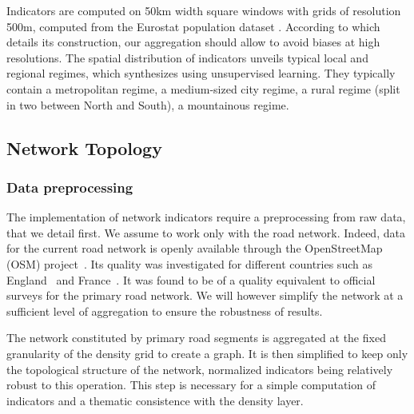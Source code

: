 Indicators are computed on 50km width square windows with grids of resolution 500m, computed from the Eurostat population dataset \citep{eurostat}. According to \cite{batista2013high} which details its construction, our aggregation should allow  to avoid biases at high resolutions. The spatial distribution of indicators unveils typical local and regional regimes, which \cite{2017arXiv170806743R} synthesizes using unsupervised learning. They typically contain a metropolitan regime, a medium-sized city regime, a rural regime (split in two between North and South), a mountainous regime.



\subsection{Network Topology}

\subsubsection{Data preprocessing}

The implementation of network indicators require a preprocessing from raw data, that we detail first. We assume to work only with the road network. Indeed, data for the current road network is openly available through the OpenStreetMap (OSM) project~\citep{openstreetmap}. Its quality was investigated for different countries such as England~\citep{haklay2010good} and France~\citep{girres2010quality}. It was found to be of a quality equivalent to official surveys for the primary road network. We will however simplify the network at a sufficient level of aggregation to ensure the robustness of results.


The network constituted by primary road segments is aggregated at the fixed granularity of the density grid to create a graph. It is then simplified to keep only the topological structure of the network, normalized indicators being relatively robust to this operation. This step is necessary for a simple computation of indicators and a thematic consistence with the density layer.

